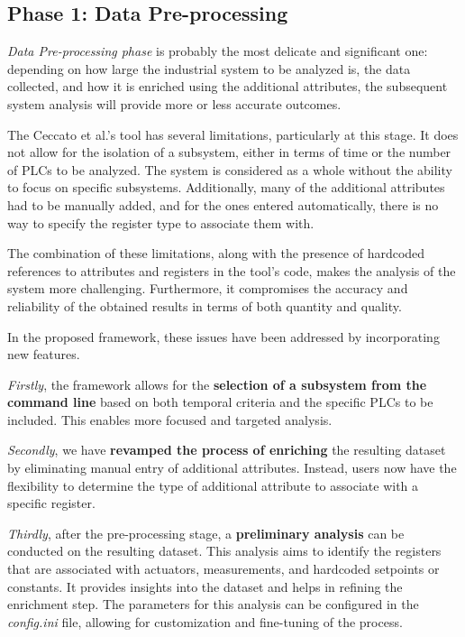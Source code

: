 \subsection{Phase 1: Data Pre-processing}
\label{subsec:4_improve_preprocessing}
\textit{Data Pre-processing phase} is probably the most delicate and significant one: depending on how large the industrial system to be analyzed is, the data collected, and how it is enriched using the additional attributes, the subsequent system analysis will provide more or less accurate outcomes.

\bigskip
The Ceccato et al.'s tool has several limitations, particularly at this stage. It does not allow for the isolation of a subsystem, either in terms of time or the number of PLCs to be analyzed. The system is considered as a whole without the ability to focus on specific subsystems. Additionally, many of the additional attributes had to be manually added, and for the ones entered automatically, there is no way to specify the register type to associate them with.

The combination of these limitations, along with the presence of hardcoded references to attributes and registers in the tool's code, makes the analysis of the system more challenging. Furthermore, it compromises the accuracy and reliability of the obtained results in terms of both quantity and quality.

\bigskip
In the proposed framework, these issues have been addressed by incorporating new features.
 
\textit{Firstly}, the framework allows for the \textbf{selection of a subsystem from the command line} based on both temporal criteria and the specific PLCs to be included. This enables more focused and targeted analysis.

\textit{Secondly}, we have \textbf{revamped the process of enriching} the resulting dataset by eliminating manual entry of additional attributes. Instead, users now have the flexibility to determine the type of additional attribute to associate with a specific register.

\textit{Thirdly}, after the pre-processing stage, a \textbf{preliminary analysis} can be conducted on the resulting dataset. This analysis aims to identify the registers that are associated with actuators, measurements, and hardcoded setpoints or constants. It provides insights into the dataset and helps in refining the enrichment step. The parameters for this analysis can be configured in the \textit{config.ini} file, allowing for customization and fine-tuning of the process.

